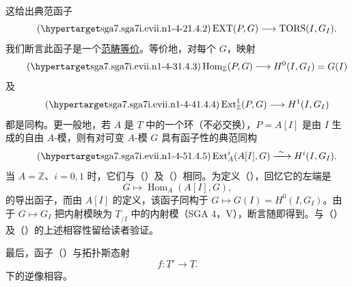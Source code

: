 这给出典范函子
\begin{equation}\tag{\SGARefTarget{sga7.sga7i.evii.n1-4-2}{1.4.2}}
 \operatorname{EXT}(P,G)\longrightarrow
 \operatorname{TORS}(I,G_I).
\end{equation}
我们断言此函子是一个\underline{范畴等价}。等价地，对每个 $G$，映射
\begin{equation}\tag{\SGARefTarget{sga7.sga7i.evii.n1-4-3}{1.4.3}}
 \operatorname{Hom}_{\mathbb Z}(P,G)\longrightarrow
 H^0(I,G_I)=G(I)
\end{equation}
及
\begin{equation}\tag{\SGARefTarget{sga7.sga7i.evii.n1-4-4}{1.4.4}}
 \operatorname{Ext}^1_{\mathbb Z}(P,G)\longrightarrow H^1(I,G_I)
\end{equation}
都是同构。更一般地，若 $A$ 是 $\underline T$ 中的一个环（不必交换），$P=A[I]$ 是由 $I$ 生成的自由 $A$-模，则有对可变 $A$-模 $G$ 具有函子性的典范同构
\begin{equation}\tag{\SGARefTarget{sga7.sga7i.evii.n1-4-5}{1.4.5}}
 \operatorname{Ext}^i_A(A[I],G)\xrightarrow{\ \sim\ }H^i(I,G_I).
\end{equation}
当 $A=\mathbb Z$、$i=0,1$ 时，它们与（）及（）相同。为定义（），回忆它的左端是
\[
 G\longmapsto\operatorname{Hom}_A(A[I],G),
\]
的导出函子，而由 $A[I]$ 的定义，该函子同构于 $G\longmapsto G(I)=H^0(I,G_I)$。由于 $G\longmapsto G_I$ 把内射模映为 $\underline T_{/I}$ 中的内射模（SGA 4，V），断言随即得到。与（）及（）的上述相容性留给读者验证。

最后，函子（）与拓扑斯态射
\[
 f:\underline T'\longrightarrow\underline T.
\]
下的逆像相容。







